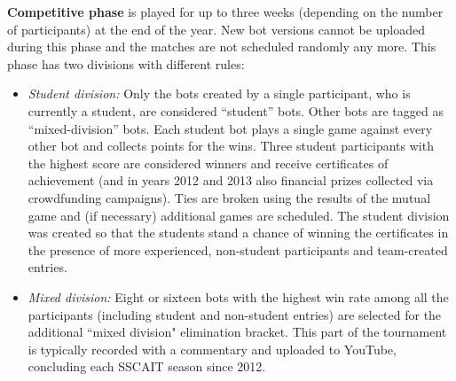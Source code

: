 \documentclass{llncs}
\begin{document}
\textbf{{Competitive phase}} is played for up to three weeks (depending on the number of participants) at the end of the year. New bot versions cannot be uploaded during this phase and the matches are not scheduled randomly any more. This phase has two divisions with different rules:
	\begin{itemize}
      \item {\em Student division:} Only the bots created by a single participant, who is currently a student, are considered ``student'' bots. Other bots are tagged as ``mixed-division'' bots. Each student bot plays a single game against every other bot and collects points for the wins. Three student participants with the highest score are considered winners and receive  certificates of achievement (and in years 2012 and 2013 also financial prizes collected via crowdfunding campaigns). Ties are broken using the results of the mutual game and (if necessary) additional games are scheduled. The student division was created so that the students stand a chance of winning the certificates in the presence of more experienced, non-student participants and team-created entries.
      \item {\em Mixed division:} Eight or sixteen bots with the highest win rate among all the participants (including student and non-student entries) are selected for the additional ``mixed division" elimination bracket. This part of the tournament is typically recorded with a commentary and uploaded to YouTube, concluding each SSCAIT season since 2012. 
    \end{itemize}
\end{document}
